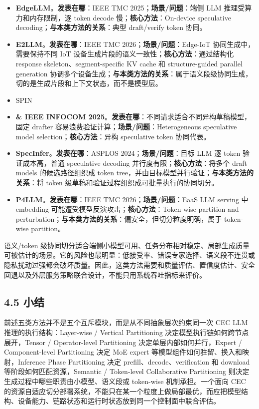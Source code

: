 \documentclass[a4paper,twocolumn,10pt]{ctexart}
\begin{document}
\begin{itemize}
\item \textbf{EdgeLLM}。\textbf{发表在哪}：IEEE TMC 2025；\textbf{场景/问题}：端侧 LLM 推理受算力和内存限制，逐 token decode 慢；\textbf{核心方法}：On-device speculative decoding；\textbf{与本类方法的关系}：典型 draft/verify token 协同。
\item \textbf{E2LLM}。\textbf{发表在哪}：IEEE TMC 2026；\textbf{场景/问题}：Edge-IoT 协同生成中，需要保持不同 IoT 设备生成片段的语义一致性；\textbf{核心方法}：通过结构化 response skeleton、segment-specific KV cache 和 structure-guided parallel generation 协调多个设备生成；\textbf{与本类方法的关系}：属于语义段级协同生成，切的是生成片段和上下文状态，而不是模型层。
\item SPIN
\item \textbf{\& IEEE INFOCOM 2025}。\textbf{发表在哪}：不同请求适合不同异构草稿模型，固定 drafter 容易浪费验证计算；\textbf{场景/问题}：Heterogeneous speculative model selection；\textbf{核心方法}：异构 speculative token 协同代表。
\item \textbf{SpecInfer}。\textbf{发表在哪}：ASPLOS 2024；\textbf{场景/问题}：目标 LLM 逐 token 验证成本高，普通 speculative decoding 并行度有限；\textbf{核心方法}：将多个 draft models 的候选路径组织成 token tree，并由目标模型并行验证；\textbf{与本类方法的关系}：将 token 级草稿和验证过程组织成可批量执行的协同切分。
\item \textbf{P4LLM}。\textbf{发表在哪}：IEEE TMC 2026；\textbf{场景/问题}：EaaS LLM serving 中 embedding 可能遭受模型反演攻击；\textbf{核心方法}：Token-wise partition and perturbation；\textbf{与本类方法的关系}：偏安全，但切分粒度明确，属于 token-wise partition。
\end{itemize}





语义/token 级协同切分适合端侧小模型可用、任务分布相对稳定、局部生成质量可被估计的场景。它的风险也最明显：低接受率、错误专家选择、语义段不连贯或隐私扰动过强都会破坏质量。因此，这类方法需要和质量评估、置信度估计、安全回退以及外层服务策略联合设计，不能只用系统吞吐指标来评价。


\subsection{4.5 小结}

前述五类方法并不是五个互斥模块，而是从不同抽象层次约束同一次 CEC LLM 推理的执行结构：Layer-wise / Vertical Partitioning 决定模型执行链如何跨节点展开，Tensor / Operator-level Partitioning 决定单层内部如何并行，Expert / Component-level Partitioning 决定 MoE expert 等模型组件如何驻留、换入和映射，Inference Phase Partitioning 决定 prefill、decode、verification 和 download 等阶段如何匹配资源，Semantic / Token-level Collaborative Partitioning 则决定生成过程中哪些职责由小模型、语义段或 token-wise 机制承担。一个面向 CEC 的资源自适应切分部署系统，不能只在某一个粒度上做局部最优，而应把模型结构、设备能力、链路状态和运行时状态放到同一个控制面中联合评估。
\end{document}
